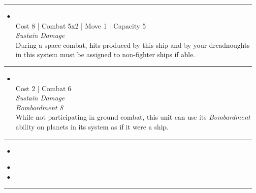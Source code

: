 \begin{multicols}{2}
\vspace{-10pt}\rule{\hsize}{0.4pt}\vspace{5pt}


\begin{itemize}
\item \name{[0.0.1]}\\
Cost 8 | Combat 5x2 | Move 1 | Capacity 5 \\
\emph{Sustain Damage}\\
During a space combat, hits produced by this ship and by your dreadnoughts in this system must be assigned to non-fighter ships if able.
\end{itemize}

\vspace{-10pt}\rule{\hsize}{0.4pt}\vspace{5pt}


\begin{itemize}
\item {}
\\
Cost 2 | Combat 6 \\
\emph{Sustain Damage}\\
\emph{Bombardment 8}\\
While not participating in ground combat, this unit can use its \emph{Bombardment} ability on planets in its system as if it were a ship.
\end{itemize}

\vspace{-10pt}\rule{\hsize}{0.4pt}\vspace{5pt}


\begin{itemize}
\item \superDreadsI
\end{itemize}

\columnbreak
{}

\begin{itemize}
\item \superDreadsII
\item \inheritence
\end{itemize}

\vspace{-10pt}\rule{\hsize}{0.4pt}\vspace{5pt}


\end{multicols}
